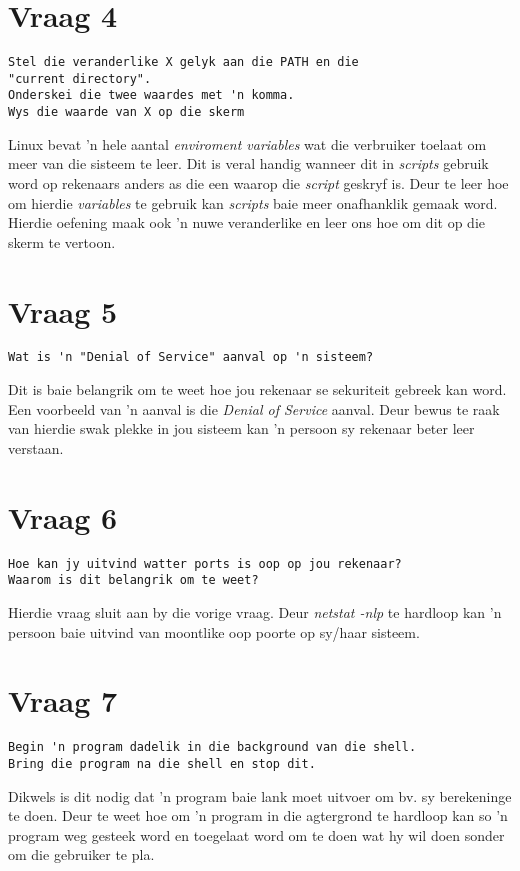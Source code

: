 \documentclass[a4paper,11pt,titlepage]{article}
\begin{document}
\section{Vraag 4}
\begin{verbatim}
Stel die veranderlike X gelyk aan die PATH en die 
"current directory". 
Onderskei die twee waardes met 'n komma.
Wys die waarde van X op die skerm
\end{verbatim}
Linux bevat 'n hele aantal \emph{enviroment variables} wat die verbruiker toelaat om meer van die sisteem te leer. Dit is veral handig wanneer dit in \emph{scripts} gebruik word op rekenaars anders as die een waarop die \emph{script} geskryf is. Deur te leer hoe om hierdie \emph{variables} te gebruik kan \emph{scripts} baie meer onafhanklik gemaak word. Hierdie oefening maak ook 'n nuwe veranderlike en leer ons hoe om dit op die skerm te vertoon.
\section{Vraag 5}
\begin{verbatim}
Wat is 'n "Denial of Service" aanval op 'n sisteem?
\end{verbatim}
Dit is baie belangrik om te weet hoe jou rekenaar se sekuriteit gebreek kan word. Een voorbeeld van 'n aanval is die \emph{Denial of Service} aanval. Deur bewus te raak van hierdie swak plekke in jou sisteem kan 'n persoon sy rekenaar beter leer verstaan.
\section{Vraag 6}
\begin{verbatim}
Hoe kan jy uitvind watter ports is oop op jou rekenaar?
Waarom is dit belangrik om te weet?
\end{verbatim}
Hierdie vraag sluit aan by die vorige vraag. Deur \emph{netstat -nlp} te hardloop kan 'n persoon baie uitvind van moontlike oop poorte op sy/haar sisteem.
\section{Vraag 7}
\begin{verbatim}
Begin 'n program dadelik in die background van die shell.
Bring die program na die shell en stop dit.
\end{verbatim}
Dikwels is dit nodig dat 'n program baie lank moet uitvoer om bv. sy berekeninge te doen. Deur te weet hoe om 'n program in die agtergrond te hardloop kan so 'n program weg gesteek word en toegelaat word om te doen wat hy wil doen sonder om die gebruiker te pla.
\end{document}
